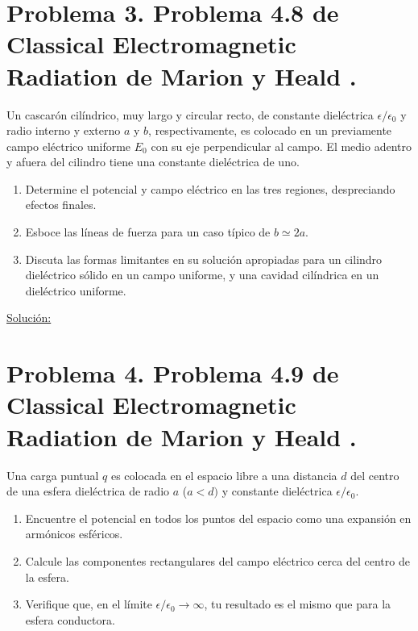 \documentclass[a4paper,11pt]{article}
\numberwithin{equation}{section}
\begin{document}
\newpage

\section{Problema 3. Problema 4.8 de Classical Electromagnetic Radiation
de Marion y Heald \cite{marion2}.}

Un cascarón cilíndrico, muy largo y circular recto, de constante dieléctrica 
$\epsilon/\epsilon_0$ y radio interno y externo $a$ y $b$, respectivamente, 
es colocado en un previamente campo eléctrico uniforme $E_0$ con su eje perpendicular 
al campo. El medio adentro y afuera del cilindro tiene una constante dieléctrica de 
uno.

\begin{enumerate}[label=\textbf{(\alph*)}]
\item Determine el potencial y campo eléctrico en las tres regiones, despreciando 
efectos finales.
\item Esboce las líneas de fuerza para un caso típico de $b \simeq 2a$.
\item Discuta las formas limitantes en su solución apropiadas para un cilindro 
dieléctrico sólido en un campo uniforme, y una cavidad cilíndrica en un dieléctrico 
uniforme.
\end{enumerate}

\vspace{.3cm}

\underline{Solución:} \vspace{.3cm}

\newpage

\section{Problema 4. Problema 4.9 de Classical Electromagnetic Radiation
de Marion y Heald \cite{marion2}.}

Una carga puntual $q$ es colocada en el espacio libre a una distancia $d$ del centro 
de una esfera dieléctrica de radio $a$ ($a < d)$ y constante dieléctrica 
$\epsilon/\epsilon_0$. 

\begin{enumerate}[label=\textbf{(\alph*)}]
\item Encuentre el potencial en todos los puntos del espacio como una expansión 
en armónicos esféricos.
\item Calcule las componentes rectangulares del campo eléctrico cerca del 
centro de la esfera.
\item Verifique que, en el límite $\epsilon/\epsilon_0 \rightarrow \infty$, tu 
resultado es el mismo que para la esfera conductora.
\end{enumerate}
\end{document}
